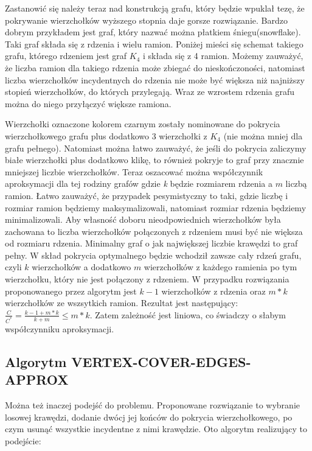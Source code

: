 	

	Zastanowić się należy teraz nad konstrukcją grafu, który będzie wpuklał tezę, że pokrywanie wierzchołków wyższego stopnia daje gorsze rozwiązanie. Bardzo dobrym przykładem jest graf, który nazwać można płatkiem śniegu(snowflake). Taki graf składa się z rdzenia i wielu ramion. Poniżej mieści się schemat takiego grafu, którego rdzeniem jest graf $K_{4}$ i składa się z 4 ramion. Możemy zauważyć, że liczba ramion dla takiego rdzenia może zbiegać do nieskończoności, natomiast liczba wierzchołków incydentnych do rdzenia nie może być większa niż najniższy stopień wierzchołków, do których przylegają. Wraz ze wzrostem rdzenia grafu można do niego przyłączyć większe ramiona.

	
	
	Wierzchołki oznaczone kolorem czarnym zostały nominowane do pokrycia wierzchołkowego grafu plus dodatkowo 3 wierzchołki z $K_{4}$ (nie można mniej dla grafu pełnego). Natomiast można łatwo zauważyć, że jeśli do pokrycia zaliczymy białe wierzchołki plus dodatkowo klikę, to również pokryje to graf przy znacznie mniejszej liczbie wierzchołków.
	Teraz oszacować można współczynnik aproksymacji dla tej rodziny grafów gdzie \textit{k} będzie rozmiarem rdzenia a $m$ liczbą  ramion. Łatwo zauważyć, że przypadek pesymistyczny to taki, gdzie liczbę i rozmiar ramion będziemy maksymalizowali, natomiast rozmiar rdzenia będziemy minimalizowali. Aby własność doboru nieodpowiednich wierzchołków była zachowana to liczba wierzchołków połączonych z rdzeniem musi być nie większa od rozmiaru rdzenia.  Minimalny graf o jak największej liczbie krawędzi to graf pełny.
	 W skład pokrycia optymalnego będzie wchodził zawsze cały rdzeń grafu, czyli $k$ wierzchołków a dodatkowo $m$ wierzchołków z każdego ramienia po tym wierzchołku, który nie jest połączony z rdzeniem. W przypadku rozwiązania proponowanego przez algorytm jest $k-1$ wierzchołków z rdzenia oraz $m*k$ wierzchołków ze wszsytkich ramion. Rezultat jest następujący: $\frac{C}{C^{*}} = \frac{k-1 + m*k}{k+m} \le m*k$. Zatem zależność jest liniowa, co świadczy o słabym współczynniku aproksymacji.

\subsection{Algorytm VERTEX-COVER-EDGES-APPROX}

	 Można też inaczej podejść do problemu. Proponowane rozwiązanie to wybranie losowej krawędzi, dodanie dwócj jej końców do pokrycia wierzchołkowego, po czym usunąć wszystkie incydentne z nimi krawędzie. Oto algorytm realizujący to podejście:


